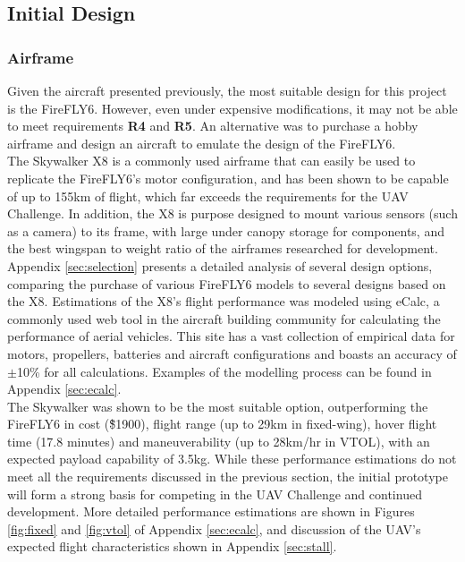\subsection{Initial Design}
\subsubsection*{Airframe}
Given the aircraft presented previously, the most suitable design for this project is the FireFLY6. However, even under expensive modifications, it may not be able to meet requirements \textbf{R4} and \textbf{R5}. An alternative was to purchase a hobby airframe and design an aircraft to emulate the design of the FireFLY6.\\

The Skywalker X8\cite{ref:x8} is a commonly used airframe that can easily be used to replicate the FireFLY6's motor configuration, and has been shown to be capable of up to 155km of flight\cite{ref:range}, which far exceeds the requirements for the UAV Challenge. In addition, the X8 is purpose designed to mount various sensors (such as a camera) to its frame, with large under canopy storage for components, and the best wingspan to weight ratio of the airframes researched for development.\\

Appendix \ref{sec:selection} presents a detailed analysis of several design options, comparing the purchase of various FireFLY6 models to several designs based on the X8. Estimations of the X8's flight performance was modeled using eCalc\cite{ref:ecalc}, a commonly used web tool in the aircraft building community for calculating the performance of aerial vehicles. This site has a vast collection of empirical data for motors, propellers, batteries and aircraft configurations and boasts an accuracy of $\pm$10\% for all calculations. Examples of the modelling process can be found in Appendix \ref{sec:ecalc}.\\

The Skywalker was shown to be the most suitable option, outperforming the FireFLY6 in cost (\~\$1900), flight range (up to 29km in fixed-wing), hover flight time (17.8 minutes) and maneuverability (up to 28km/hr in VTOL), with an expected payload capability of 3.5kg. While these performance estimations do not meet all the requirements discussed in the previous section, the initial prototype will form a strong basis for competing in the UAV Challenge and continued development. More detailed performance estimations are shown in Figures \ref{fig:fixed} and \ref{fig:vtol} of Appendix \ref{sec:ecalc}, and discussion of the UAV's expected flight characteristics shown in Appendix \ref{sec:stall}.


